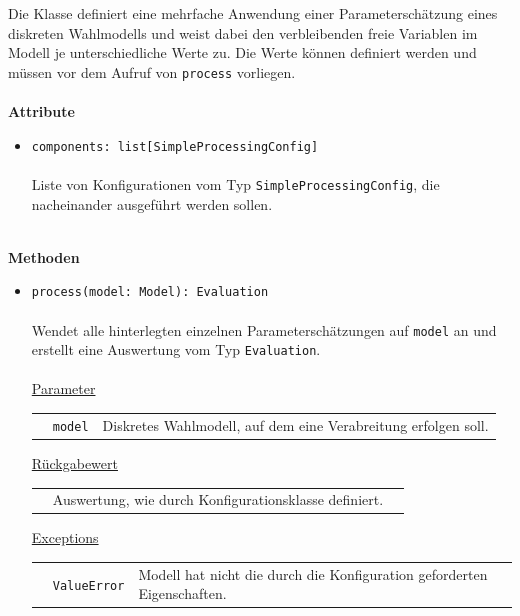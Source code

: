 \documentclass{article}
\begin{document}
Die Klasse definiert eine mehrfache Anwendung einer Parameterschätzung eines diskreten Wahlmodells und weist dabei den verbleibenden freie Variablen im Modell je unterschiedliche Werte zu. Die Werte können definiert werden und müssen vor dem Aufruf von \texttt{process} vorliegen.
\\\\

\textbf{Attribute}
\begin{itemize}\setlength\itemsep{3em}
\item \texttt{components: list[SimpleProcessingConfig]}\\\\
Liste von Konfigurationen vom Typ \texttt{SimpleProcessingConfig}, die nacheinander ausgeführt werden sollen.
\\\\
\end{itemize}

\textbf{Methoden}
\begin{itemize}\setlength\itemsep{3em}
\item \texttt{process(model: Model): Evaluation}\\\\
Wendet alle hinterlegten einzelnen Parameterschätzungen auf \texttt{model} an und erstellt eine Auswertung vom Typ \texttt{Evaluation}.
\\\\
\underline{Parameter}\\
\begin{tabular}{lll}
 & \texttt{model} & Diskretes Wahlmodell, auf dem eine Verabreitung erfolgen soll.\\
\end{tabular}

\underline{Rückgabewert}\\
\begin{tabular}{lll}
 & Auswertung, wie durch Konfigurationsklasse definiert.\\
\end{tabular}

\underline{Exceptions}\\
\begin{tabular}{lll}
 & \texttt{ValueError} & Modell hat nicht die durch die Konfiguration geforderten Eigenschaften.\\
\end{tabular}
\end{itemize}
\end{document}
